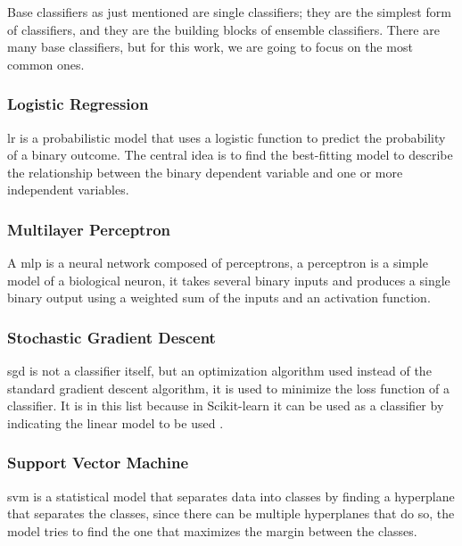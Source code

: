 Base classifiers as just mentioned are single classifiers; 
they are the simplest form of classifiers, and they are the building blocks of ensemble classifiers. There are many base classifiers, but for this work, we are going to focus on the most common ones. 


\subsubsection{Logistic Regression}
\ac{lr} is a probabilistic model that uses a logistic function to predict the probability of a binary outcome. The central idea is to find the best-fitting model to describe the relationship between the binary dependent variable and one or more independent variables.

\subsubsection{Multilayer Perceptron}
A \ac{mlp} is a neural network composed of perceptrons, a perceptron is a simple model of a biological neuron, it takes several binary inputs and produces a single binary output using a weighted sum of the inputs and an activation function.

\subsubsection{Stochastic Gradient Descent}
\ac{sgd} is not a classifier itself, but an optimization algorithm used instead of the standard gradient descent algorithm, it is used to minimize the loss function of a classifier. It is in this list because in Scikit-learn it can be used as a classifier by indicating the linear model to be used \cite{noauthor_sklearnlinear_modelsgdclassifier_nodate}.

\subsubsection{Support Vector Machine}
\ac{svm} is a statistical model that separates data into classes by finding a hyperplane that separates the classes, since there can be multiple hyperplanes that do so, the model tries to find the one that maximizes the margin between the classes.

